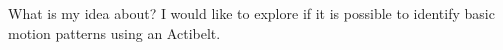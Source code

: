 What is my idea about?
I would like to explore if it is possible to identify basic motion patterns using an Actibelt.

